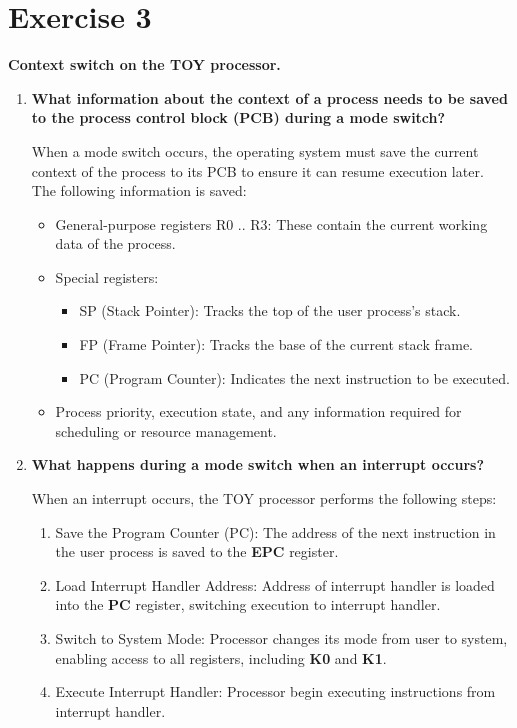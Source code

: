 \documentclass{article}
\newcommand{\exercise}[1]{
    \section*{Exercise #1}
    \markboth{Exercise #1}{}
}
\begin{document}
\newpage
\exercise{3}

\textbf{Context switch on the TOY processor.}

\begin{enumerate}[label=\textbf{\alph*})]
    \item \textbf{What information about the context of a process needs to be saved to the process control block (PCB) during a mode switch?}
    
    When a mode switch occurs, the operating system must save the current context of the process to its PCB to ensure it can resume execution later. The following information is saved:
    \begin{itemize}
        \item General-purpose registers R0 .. R3: These contain the current working
        data of the process.
        \item Special registers:
        \begin{itemize}
            \item SP (Stack Pointer): Tracks the top of the user process's stack.
            \item FP (Frame Pointer): Tracks the base of the current stack frame.
            \item PC (Program Counter): Indicates the next instruction to be executed.
        \end{itemize}
        \item Process priority, execution state, and any information required
        for scheduling or resource management.
    \end{itemize}


    \item \textbf{What happens during a mode switch when an interrupt occurs?}

    When an interrupt occurs, the TOY processor performs the following steps:
    \begin{enumerate}
        \item Save the Program Counter (PC): The address of the next instruction
        in the user process is saved to the \textbf{EPC} register.
        \item Load Interrupt Handler Address: Address of interrupt
        handler is loaded into the \textbf{PC} register, switching execution
        to interrupt handler.
        \item Switch to System Mode: Processor changes its mode from user to system,
        enabling access to all registers, including \textbf{K0} and \textbf{K1}.
        \item Execute Interrupt Handler: Processor begin executing
        instructions from interrupt handler.
    \end{enumerate}


\end{enumerate}
\end{document}

